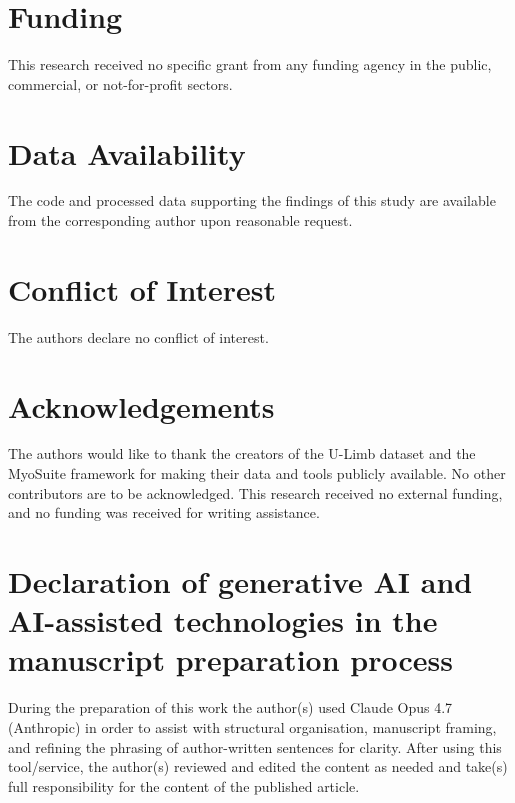\documentclass[12pt, a4paper]{elsarticle}
\begin{document}
\section*{Funding}
This research received no specific grant from any funding agency in the public, commercial, or not-for-profit sectors.


\section*{Data Availability}
The code and processed data supporting the findings of this study are available from the corresponding author upon reasonable request.

\section*{Conflict of Interest}
The authors declare no conflict of interest.

\section*{Acknowledgements}
The authors would like to thank the creators of the U-Limb dataset and the MyoSuite framework for making their data and tools publicly available. No other contributors are to be acknowledged. This research received no external funding, and no funding was received for writing assistance.

\section*{Declaration of generative AI and AI-assisted technologies in the manuscript preparation process}
During the preparation of this work the author(s) used Claude Opus 4.7 (Anthropic) in order to assist with structural organisation, manuscript framing, and refining the phrasing of author-written sentences for clarity. After using this tool/service, the author(s) reviewed and edited the content as needed and take(s) full responsibility for the content of the published article.



\end{document}
